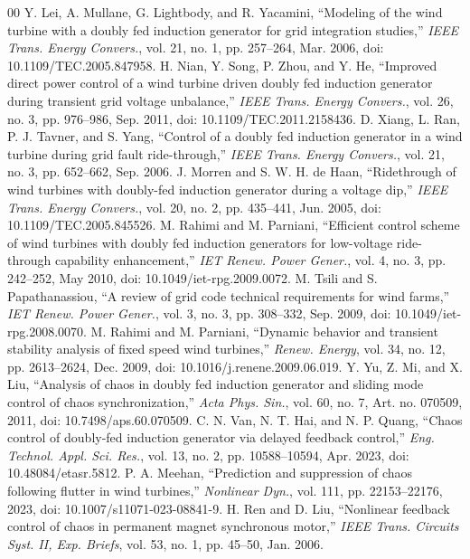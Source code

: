 \documentclass[conference]{IEEEtran}
\begin{document}
\begin{thebibliography}{00}
 Y. Lei, A. Mullane, G. Lightbody, and R. Yacamini, ``Modeling of the wind turbine with a doubly fed induction generator for grid integration studies,'' \textit{IEEE Trans. Energy Convers.}, vol. 21, no. 1, pp. 257--264, Mar. 2006, doi: 10.1109/TEC.2005.847958.
 H. Nian, Y. Song, P. Zhou, and Y. He, ``Improved direct power control of a wind turbine driven doubly fed induction generator during transient grid voltage unbalance,'' \textit{IEEE Trans. Energy Convers.}, vol. 26, no. 3, pp. 976--986, Sep. 2011, doi: 10.1109/TEC.2011.2158436.
 D. Xiang, L. Ran, P. J. Tavner, and S. Yang, ``Control of a doubly fed induction generator in a wind turbine during grid fault ride-through,'' \textit{IEEE Trans. Energy Convers.}, vol. 21, no. 3, pp. 652--662, Sep. 2006.
 J. Morren and S. W. H. de Haan, ``Ridethrough of wind turbines with doubly-fed induction generator during a voltage dip,'' \textit{IEEE Trans. Energy Convers.}, vol. 20, no. 2, pp. 435--441, Jun. 2005, doi: 10.1109/TEC.2005.845526.
 M. Rahimi and M. Parniani, ``Efficient control scheme of wind turbines with doubly fed induction generators for low-voltage ride-through capability enhancement,'' \textit{IET Renew. Power Gener.}, vol. 4, no. 3, pp. 242--252, May 2010, doi: 10.1049/iet-rpg.2009.0072.
 M. Tsili and S. Papathanassiou, ``A review of grid code technical requirements for wind farms,'' \textit{IET Renew. Power Gener.}, vol. 3, no. 3, pp. 308--332, Sep. 2009, doi: 10.1049/iet-rpg.2008.0070.
 M. Rahimi and M. Parniani, ``Dynamic behavior and transient stability analysis of fixed speed wind turbines,'' \textit{Renew. Energy}, vol. 34, no. 12, pp. 2613--2624, Dec. 2009, doi: 10.1016/j.renene.2009.06.019.
 Y. Yu, Z. Mi, and X. Liu, ``Analysis of chaos in doubly fed induction generator and sliding mode control of chaos synchronization,'' \textit{Acta Phys. Sin.}, vol. 60, no. 7, Art. no. 070509, 2011, doi: 10.7498/aps.60.070509.
 C. N. Van, N. T. Hai, and N. P. Quang, ``Chaos control of doubly-fed induction generator via delayed feedback control,'' \textit{Eng. Technol. Appl. Sci. Res.}, vol. 13, no. 2, pp. 10588--10594, Apr. 2023, doi: 10.48084/etasr.5812.
 P. A. Meehan, ``Prediction and suppression of chaos following flutter in wind turbines,'' \textit{Nonlinear Dyn.}, vol. 111, pp. 22153--22176, 2023, doi: 10.1007/s11071-023-08841-9.
 H. Ren and D. Liu, ``Nonlinear feedback control of chaos in permanent magnet synchronous motor,'' \textit{IEEE Trans. Circuits Syst. II, Exp. Briefs}, vol. 53, no. 1, pp. 45--50, Jan. 2006.

\end{thebibliography}
\end{document}
